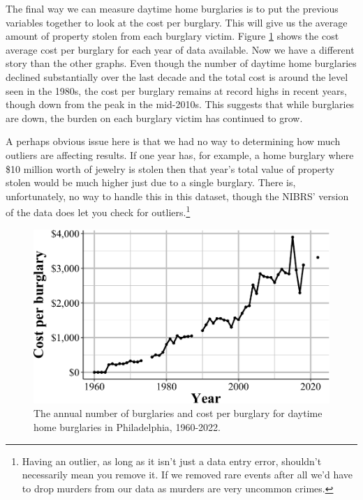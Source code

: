 \documentclass[
  12pt,
  openany]{book}
\begin{document}
The final way we can measure daytime home burglaries is to put the previous variables together to look at the cost per burglary. This will give us the average amount of property stolen from each burglary victim. Figure \ref{fig:phillyHomeCostPerBurglary} shows the cost average cost per burglary for each year of data available. Now we have a different story than the other graphs. Even though the number of daytime home burglaries declined substantially over the last decade and the total cost is around the level seen in the 1980s, the cost per burglary remains at record highs in recent years, though down from the peak in the mid-2010s. This suggests that while burglaries are down, the burden on each burglary victim has continued to grow.

A perhaps obvious issue here is that we had no way to determining how much outliers are affecting results. If one year has, for example, a home burglary where \$10 million worth of jewelry is stolen then that year's total value of property stolen would be much higher just due to a single burglary. There is, unfortunately, no way to handle this in this dataset, though the NIBRS' version of the data does let you check for outliers.\footnote{Having an outlier, as long as it isn't just a data entry error, shouldn't necessarily mean you remove it. If we removed rare events after all we'd have to drop murders from our data as murders are very uncommon crimes.}

\begin{figure}

{\centering \includegraphics[width=0.9\linewidth]{04_stolen_property_files/figure-latex/phillyHomeCostPerBurglary-1} 

}

\caption{The annual number of burglaries and cost per burglary for daytime home burglaries in Philadelphia, 1960-2022.}\label{fig:phillyHomeCostPerBurglary}
\end{figure}
\end{document}
